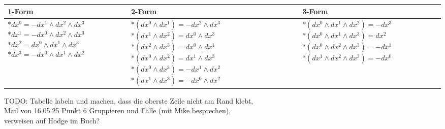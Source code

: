 \begin{center}
	\begin{tabularx}{\textwidth}{ 
			| >{\centering\arraybackslash}X 
			| >{\centering\arraybackslash}X 
			| >{\centering\arraybackslash}X | }
		\hline
		\textbf{1-Form} & \textbf{2-Form} & \textbf{3-Form} \\
		\hline
		\( *dx^0 = -dx^1 \wedge dx^2 \wedge dx^3 \) \newline
		\( *dx^1 = -dx^0 \wedge dx^2 \wedge dx^3 \) \newline
		\( *dx^2 =  dx^0 \wedge dx^1 \wedge dx^3 \) \newline
		\( *dx^3 = -dx^0 \wedge dx^1 \wedge dx^2 \) 
		&
		\( *(dx^0 \wedge dx^1) = -dx^2 \wedge dx^3 \) \newline
		\( *(dx^1 \wedge dx^2) = dx^0 \wedge dx^3 \) \newline
		\( *(dx^2 \wedge dx^3) = dx^0 \wedge dx^1 \) \newline
		\( *(dx^0 \wedge dx^2) = dx^1 \wedge dx^3 \) \newline
		\( *(dx^0 \wedge dx^3) = -dx^1 \wedge dx^2 \) \newline
		\( *(dx^1 \wedge dx^3) = -dx^0 \wedge dx^2 \)
		&
		\( *(dx^0 \wedge dx^1 \wedge dx^2) = -dx^3 \) \newline
		\( *(dx^0 \wedge dx^1 \wedge dx^3) = dx^2 \) \newline
		\( *(dx^0 \wedge dx^2 \wedge dx^3) = -dx^1 \) \newline
		\( *(dx^1 \wedge dx^2 \wedge dx^3) = -dx^0 \)
		\\
		\hline
	\end{tabularx}
\end{center}
TODO: Tabelle labeln und machen, dass die oberste Zeile nicht am Rand klebt,\\
Mail von 16.05.25 Punkt 6 Gruppieren und Fälle (mit Mike besprechen),\\
verweisen auf Hodge im Buch?





